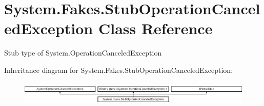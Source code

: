 \hypertarget{class_system_1_1_fakes_1_1_stub_operation_canceled_exception}{\section{System.\-Fakes.\-Stub\-Operation\-Canceled\-Exception Class Reference}
\label{class_system_1_1_fakes_1_1_stub_operation_canceled_exception}
}


Stub type of System.\-Operation\-Canceled\-Exception 


Inheritance diagram for System.\-Fakes.\-Stub\-Operation\-Canceled\-Exception\-:\begin{figure}[H]
\begin{center}
\leavevmode
\includegraphics[height=1.170324cm]{class_system_1_1_fakes_1_1_stub_operation_canceled_exception}
\end{center}
\end{figure}
